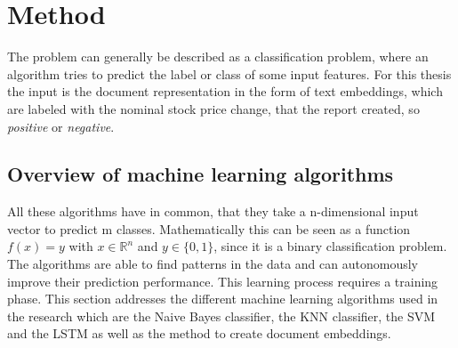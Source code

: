 \chapter{Method}\label{ch:method}

The problem can generally be described as a classification problem, where an algorithm tries to predict the label or class of some input features.
For this thesis the input is the document representation in the form of text embeddings, which are labeled with the nominal stock price change, that the report created, so \textit{positive} or \textit{negative}.

\section{Overview of machine learning algorithms}
All these algorithms have in common, that they take a n-dimensional input vector to predict m classes.
Mathematically this can be seen as a function $f(x)=y$ with $x\in\mathbb{R}^n$ and $y\in\{0, 1\}$, since it is a binary classification problem.
The algorithms are able to find patterns in the data and can autonomously improve their prediction performance.
This learning process requires a training phase.
This section addresses the different machine learning algorithms used in the research which are the Naive Bayes classifier, the \acl{KNN} classifier, the \acl{SVM} and the \acl{LSTM} as well as the method to create document embeddings.
